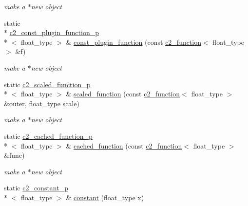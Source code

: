 \begin{DoxyCompactItemize}
\begin{DoxyCompactList}\small\item\em make a $\ast$new object \end{DoxyCompactList}\item 
\hypertarget{classc2__factory_ae377e5df1c8b6eb95b5b02cf8da0667d}{static \\*
\hyperlink{classc2__const__plugin__function__p}{c2\-\_\-const\-\_\-plugin\-\_\-function\-\_\-p}\\*
$<$ float\-\_\-type $>$ \& \hyperlink{classc2__factory_ae377e5df1c8b6eb95b5b02cf8da0667d}{const\-\_\-plugin\-\_\-function} (const \hyperlink{classc2__function}{c2\-\_\-function}$<$ float\-\_\-type $>$ \&f)}\label{classc2__factory_ae377e5df1c8b6eb95b5b02cf8da0667d}

\begin{DoxyCompactList}\small\item\em make a $\ast$new object \end{DoxyCompactList}\item 
\hypertarget{classc2__factory_a81a7b686b7ffa389ad4dcd8d18997332}{static \hyperlink{classc2__scaled__function__p}{c2\-\_\-scaled\-\_\-function\-\_\-p}\\*
$<$ float\-\_\-type $>$ \& \hyperlink{classc2__factory_a81a7b686b7ffa389ad4dcd8d18997332}{scaled\-\_\-function} (const \hyperlink{classc2__function}{c2\-\_\-function}$<$ float\-\_\-type $>$ \&outer, float\-\_\-type scale)}\label{classc2__factory_a81a7b686b7ffa389ad4dcd8d18997332}

\begin{DoxyCompactList}\small\item\em make a $\ast$new object \end{DoxyCompactList}\item 
\hypertarget{classc2__factory_aff889f94ad411d97f2e47f1c55fd0324}{static \hyperlink{classc2__cached__function__p}{c2\-\_\-cached\-\_\-function\-\_\-p}\\*
$<$ float\-\_\-type $>$ \& \hyperlink{classc2__factory_aff889f94ad411d97f2e47f1c55fd0324}{cached\-\_\-function} (const \hyperlink{classc2__function}{c2\-\_\-function}$<$ float\-\_\-type $>$ \&func)}\label{classc2__factory_aff889f94ad411d97f2e47f1c55fd0324}

\begin{DoxyCompactList}\small\item\em make a $\ast$new object \end{DoxyCompactList}\item 
\hypertarget{classc2__factory_a98e385b2b927d15d4376821302061d4d}{static \hyperlink{classc2__constant__p}{c2\-\_\-constant\-\_\-p}\\*
$<$ float\-\_\-type $>$ \& \hyperlink{classc2__factory_a98e385b2b927d15d4376821302061d4d}{constant} (float\-\_\-type x)}\label{classc2__factory_a98e385b2b927d15d4376821302061d4d}


\end{DoxyCompactItemize}
